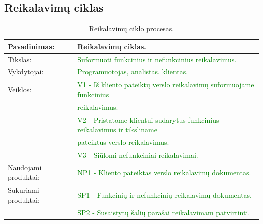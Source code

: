 \documentclass{VUMIFPSkursinis}
\begin{document}
	\subsection{Reikalavimų ciklas}
	\begin{center}
		\begin{table}[ht]
			\caption{Reikalavimų ciklo procesas.}
			\begin{tabular}{ | l | l | }
				\hline
				Pavadinimas:          & Reikalavimų ciklas.                                                                                                            \\ \hline
				Tikslas:              & \textcolor{green}{Suformuoti funkcinius ir nefunkcinius reikalavimus.}                                                         \\ \hline
				Vykdytojai:           & \textcolor{green}{Programuotojas, analistas, klientas.}                                                                        \\ \hline
				Veiklos:              & \textcolor{green}{V1 - Iš kliento pateiktų verslo reikalavimų suformuojame funkcinius} \\& \textcolor{green}{reikalavimus.}    \\
															& \textcolor{green}{V2 - Pristatome klientui sudarytus funkcinius reikalavimus ir tiksliname} \\& \textcolor{green}{pateiktus verslo reikalavimus.} \\
				                      & \textcolor{green}{V3 - Siūlomi nefunkciniai reikalavimai.}                                                                     \\ \hline
				Naudojami produktai:  & \textcolor{green}{NP1 - Kliento pateiktas verslo reikalavimų dokumentas.}                                                      \\ \hline
				Sukuriami produktai:  & \textcolor{green}{SP1 - Funkcinių ir nefunkcinių reikalavimų dokumentas.}                                                      \\ \hline
				                      & \textcolor{green}{SP2 - Susaistytų šalių parašai reikalavimam patvirtinti.}                                                    \\ \hline
			\end{tabular}
		\end{table}
	\end{center}
\end{document}

